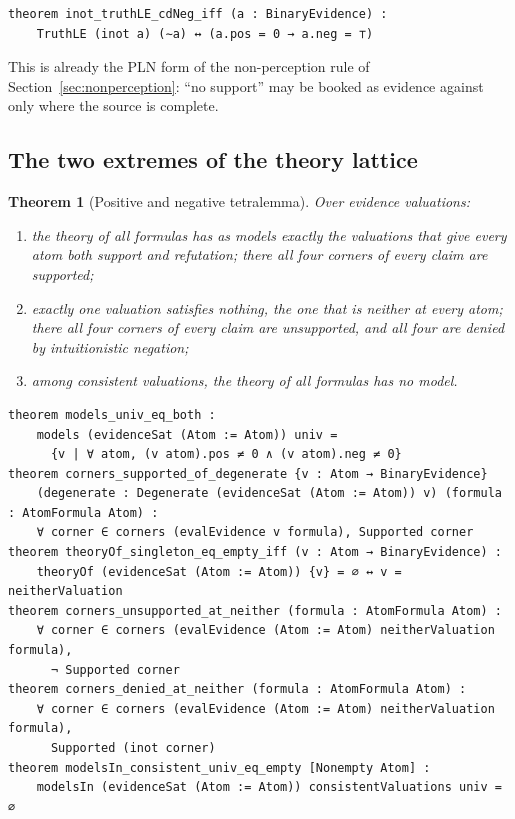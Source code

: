 \documentclass[11pt]{article}
\theoremstyle{plain}
\newtheorem{theorem}{Theorem}[section]
\theoremstyle{definition}
\begin{document}
\begin{lstlisting}
theorem inot_truthLE_cdNeg_iff (a : BinaryEvidence) :
    TruthLE (inot a) (∼a) ↔ (a.pos = 0 → a.neg = ⊤)
\end{lstlisting}

\noindent This is already the PLN form of the non-perception rule of
Section~\ref{sec:nonperception}: ``no support'' may be booked as evidence against only where
the source is complete.

\subsection{The two extremes of the theory lattice}
\label{sec:extremes}

\begin{theorem}[Positive and negative tetralemma]
Over evidence valuations:
\begin{enumerate}
\item the theory of all formulas has as models exactly the valuations that give every atom
both support and refutation; there all four corners of every claim are supported;
\item exactly one valuation satisfies nothing, the one that is \emph{neither} at every atom;
there all four corners of every claim are unsupported, and all four are denied by
intuitionistic negation;
\item among consistent valuations, the theory of all formulas has no model.
\end{enumerate}
\end{theorem}

\begin{lstlisting}
theorem models_univ_eq_both :
    models (evidenceSat (Atom := Atom)) univ =
      {v | ∀ atom, (v atom).pos ≠ 0 ∧ (v atom).neg ≠ 0}
theorem corners_supported_of_degenerate {v : Atom → BinaryEvidence}
    (degenerate : Degenerate (evidenceSat (Atom := Atom)) v) (formula : AtomFormula Atom) :
    ∀ corner ∈ corners (evalEvidence v formula), Supported corner
theorem theoryOf_singleton_eq_empty_iff (v : Atom → BinaryEvidence) :
    theoryOf (evidenceSat (Atom := Atom)) {v} = ∅ ↔ v = neitherValuation
theorem corners_unsupported_at_neither (formula : AtomFormula Atom) :
    ∀ corner ∈ corners (evalEvidence (Atom := Atom) neitherValuation formula),
      ¬ Supported corner
theorem corners_denied_at_neither (formula : AtomFormula Atom) :
    ∀ corner ∈ corners (evalEvidence (Atom := Atom) neitherValuation formula),
      Supported (inot corner)
theorem modelsIn_consistent_univ_eq_empty [Nonempty Atom] :
    modelsIn (evidenceSat (Atom := Atom)) consistentValuations univ = ∅
\end{lstlisting}
\end{document}
